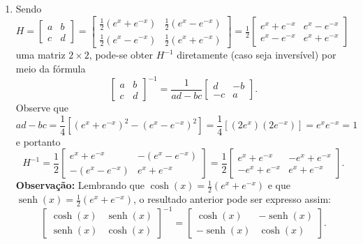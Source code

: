 \documentclass[12pt,a4paper]{article}
\newcommand*\senh{\operatorname{senh}}
\begin{document}
\begin{enumerate}
\item Sendo $H =
\begin{bmatrix}
a & b \\
c & d
\end{bmatrix}
=
\begin{bmatrix}
\frac{1}{2}(e^x+e^{-x}) & \frac{1}{2}(e^x-e^{-x}) \\
\frac{1}{2}(e^x-e^{-x}) & \frac{1}{2}(e^x+e^{-x})
\end{bmatrix}
=
\frac{1}{2}
\begin{bmatrix}
e^x+e^{-x} & e^x-e^{-x} \\
e^x-e^{-x} & e^x+e^{-x}
\end{bmatrix}
$ uma matriz $2 \times 2$, pode-se obter $H^{-1}$ diretamente (caso seja inversível) por meio da fórmula
\[
\begin{bmatrix}
a & b\\
c& d
\end{bmatrix}^{-1}
=
\frac{1}{ad-bc}
\begin{bmatrix}
d & -b\\
-c& a
\end{bmatrix}.
\]
Observe que
\[
ad - bc
= \frac{1}{4}\left[ (e^x+e^{-x})^2 - (e^x-e^{-x})^2 \right]
= \frac{1}{4}\left[ (2e^x)(2e^{-x}) \right]
= e^x e^{-x}
= 1
\]
e portanto
\[
H^{-1}
=
\frac{1}{2}
\begin{bmatrix}
e^x+e^{-x} & -(e^x-e^{-x}) \\
-(e^x-e^{-x}) & e^x+e^{-x}
\end{bmatrix}
=
\frac{1}{2}
\begin{bmatrix}
e^x+e^{-x} & -e^x+e^{-x} \\
-e^x+e^{-x} & e^x+e^{-x}
\end{bmatrix}.
\]
\textbf{Observação:} Lembrando que $\cosh(x) = \frac{1}{2}(e^x+e^{-x})$ e que $\senh(x) = \frac{1}{2}(e^x+e^{-x})$, o resultado anterior pode ser expresso assim:
\[
\begin{bmatrix}
\cosh(x) & \senh(x) \\
\senh(x) & \cosh(x)
\end{bmatrix}^{-1}
=
\begin{bmatrix}
 \cosh(x) & -\senh(x) \\
-\senh(x) & \cosh(x)
\end{bmatrix}.
\]



\end{enumerate}
\end{document}
